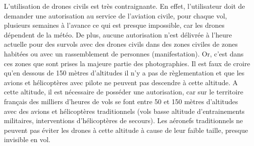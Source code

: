 L’utilisation de drones civils est très contraignante. En effet, l’utilisateur doit de demander une autorisation au service de l’aviation civile, pour chaque vol, plusieurs semaines à l’avance ce qui est presque impossible, car les drones dépendent de la météo. De plus, aucune autorisation n’est délivrée à l’heure actuelle pour des survols avec des drones civils dans des zones civiles de zones habitées ou avec un rassemblement de personnes (manifestation). Or, c’est dans ces zones que sont prises la majeure partie des photographies. Il est faux de croire qu’en dessous de 150 mètres d’altitudes il n’y a pas de règlementation et que les avions et hélicoptères avec pilote ne peuvent pas descendre à cette altitude. A cette altitude, il est nécessaire de posséder une autorisation, car sur le territoire français des milliers d’heures de vols se font entre 50 et 150 mètres d’altitudes avec des avions et hélicoptères traditionnels (vols basse altitude d’entrainements militaires, interventions d’hélicoptères de secours).  Les aéronefs traditionnels  ne peuvent pas éviter les drones à cette altitude à cause de leur faible taille, presque invisible en vol. 

